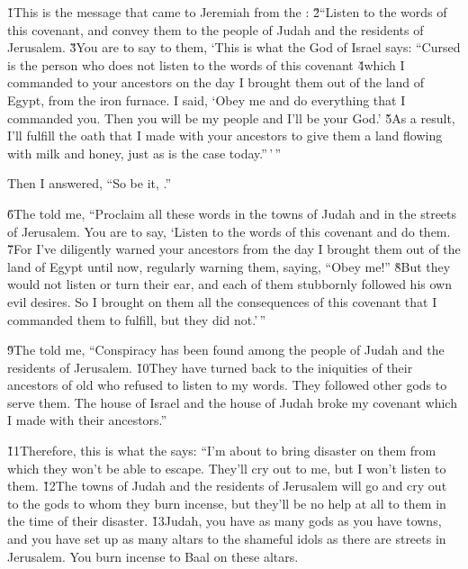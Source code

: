 \v{1}This is the message that came to Jeremiah from the : \v{2}``Listen to the words of this covenant, and convey them to the people of Judah and the residents of Jerusalem. \v{3}You are to say to them, `This is what the  God of Israel says: ``Cursed is the person who does not listen to the words of this covenant \v{4}which I commanded to your ancestors on the day I brought them out of the land of Egypt, from the iron furnace. I said, `Obey me and do everything that I commanded you. Then you will be my people and I'll be your God.' \v{5}As a result, I'll fulfill the oath that I made with your ancestors to give them a land flowing with milk and honey, just as is the case today.''\,'\,''

Then I answered, ``So be it, .''

\v{6}The  told me, ``Proclaim all these words in the towns of Judah and in the streets of Jerusalem. You are to say, `Listen to the words of this covenant and do them. \v{7}For I've diligently warned your ancestors from the day I brought them out of the land of Egypt until now, regularly warning them, saying, ``Obey me!'' \v{8}But they would not listen or turn their ear, and each of them stubbornly followed his own evil desires. So I brought on them all the consequences of this covenant that I commanded them to fulfill, but they did not.'\,''

\v{9}The  told me, ``Conspiracy has been found among the people of Judah and the residents of Jerusalem. \v{10}They have turned back to the iniquities of their ancestors of old who refused to listen to my words. They followed other gods to serve them. The house of Israel and the house of Judah broke my covenant which I made with their ancestors.''

\v{11}Therefore, this is what the  says: ``I'm about to bring disaster on them from which they won't be able to escape. They'll cry out to me, but I won't listen to them. \v{12}The towns of Judah and the residents of Jerusalem will go and cry out to the gods to whom they burn incense, but they'll be no help at all to them in the time of their disaster. \v{13}Judah, you have as many gods as you have towns, and you have set up as many altars to the shameful idols as there are streets in Jerusalem. You burn incense to Baal on these altars.

